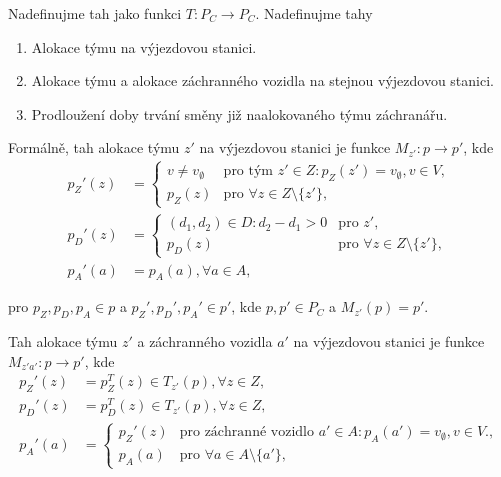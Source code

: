 \begin{definice}[Tah]\label{df:tah}
  Nadefinujme tah jako funkci $T \colon P_C \rightarrow P_C$.
  Nadefinujme tahy
  \begin{enumerate}
    \item
      Alokace týmu na výjezdovou stanici.

    \item
      Alokace týmu a alokace záchranného vozidla na stejnou výjezdovou stanici.

    \item
      Prodloužení doby trvání směny již naalokovaného týmu záchranářu. 
  \end{enumerate}

  Formálně, tah alokace týmu $z'$ na výjezdovou stanici je funkce $M_{z'} : p \rightarrow p'$, kde
  \begin{align*}
    p_Z'(z) &=
      \begin{cases}
        v \neq v_{\emptyset} & \text{pro tým $z' \in Z \colon p_Z(z') = v_{\emptyset}, v \in V$}, \\
        p_Z(z) & \text{pro $\forall z \in Z \setminus \{ z' \}$},
      \end{cases}
      \\
    p_D'(z) &=
      \begin{cases}
        (d_1, d_2) \in D \colon d_2 - d_1 > 0 & \text{pro $z'$}, \\
        p_D(z) & \text{pro $\forall z \in Z \setminus \{ z' \}$},
      \end{cases}
      \\
    p_A'(a) &= p_A(a), \forall a \in A,
  \end{align*}

  pro $p_Z, p_D, p_A \in p$ a $p_Z', p_D', p_A' \in p'$, kde $p, p' \in P_C$ a $M_{z'}(p) = p'$.

  Tah alokace týmu $z'$ a záchranného vozidla $a'$ na výjezdovou stanici je funkce $M_{z'a'} : p \rightarrow p'$, kde
  \begin{align*}
    p_Z'(z) &= p_Z^T(z) \in T_{z'}(p), \forall z \in Z,
    \\
    p_D'(z) &= p_D^T(z) \in T_{z'}(p), \forall z \in Z,
    \\
    p_A'(a) &=
    \begin{cases}
      p_Z'(z) & \text{pro záchranné vozidlo $a' \in A \colon p_A(a') = v_{\emptyset}, v \in V$.}, \\
      p_A(a) & \text{pro $\forall a \in A \setminus \{ a' \}$},
    \end{cases}
  \end{align*}


\end{definice}
